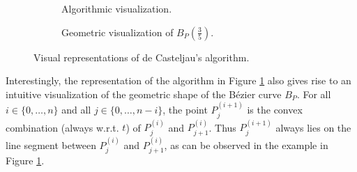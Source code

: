 \documentclass[a4paper, 11pt]{report}
\theoremstyle{definition}
\begin{document}
	\begin{figure}[H]
		\centering
		\begin{subfigure}{0.49\textwidth}
			\caption{Algorithmic visualization.}
		\end{subfigure}
		\hfill
		\begin{subfigure}{0.49\textwidth}
			
			\caption{Geometric visualization of $B_P(\frac{3}{5})$.}
		\end{subfigure}
		\caption{Visual representations of de Casteljau's algorithm.}
		\label{fig:decasteljautriangle}
	\end{figure}

	Interestingly, the representation of the algorithm in Figure \ref{fig:decasteljautriangle} also gives rise to an intuitive visualization of the geometric shape of the Bézier curve $B_P$. For all $i \in \{0, \ldots, n\}$ and all $j \in \{0, \ldots, n-i\}$, the point $P^{(i+1)}_j$ is the convex combination (always w.r.t. $t$) of $P^{(i)}_j$ and $P^{(i)}_{j+1}$. Thus $P^{(i+1)}_j$ always lies on the line segment between $P^{(i)}_j$ and $P^{(i)}_{j+1}$, as can be observed in the example in Figure \ref{fig:decasteljautriangle}.
\end{document}
